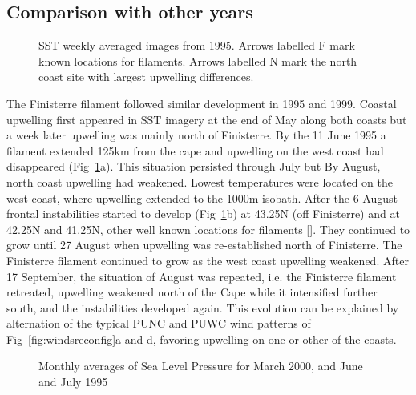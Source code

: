 \subsection{Comparison with other years}
\subcapnoonelinetrue \subfiguretopcapfalse
\begin{figure}[t]
\centering \subfigure[June 18-24]
{\texttt{[image: ga950618]}}\quad \subfigure[August
06-12] {\texttt{[image: ga950806]}}\quad \caption{SST
weekly averaged images from 1995. Arrows labelled F mark known
locations for filaments. Arrows labelled N mark the north coast
site with largest upwelling differences.}\label{fig:windssst95}
\end{figure}

The Finisterre filament followed similar development in 1995 and
1999. Coastal upwelling first appeared in SST imagery at the end
of May along both coasts but a week later upwelling was mainly
north of Finisterre. By the 11 June 1995 a filament extended 125km
from the cape and upwelling on the west coast had disappeared
({Fig~\ref{fig:windssst95}}a). This situation persisted through
July but By August, north coast upwelling had weakened. Lowest
temperatures were located on the west coast, where upwelling
extended to the 1000m isobath. After the 6 August frontal
instabilities started to develop ({Fig~\ref{fig:windssst95}}b) at
43.25\deg N (off Finisterre) and at 42.25\deg N and 41.25\deg N,
other well known locations for filaments
\nocite{Haynes93}[]. They
continued to grow until 27 August when upwelling was
re-established north of Finisterre. The Finisterre filament
continued to grow as the west coast upwelling weakened. After 17
September, the situation of August was repeated, i.e. the
Finisterre filament retreated, upwelling weakened north of the
Cape  while it intensified further south, and the instabilities
developed again.  This evolution can be explained by alternation
of the typical PUNC and PUWC wind patterns of
Fig~\ref{fig:windsreconfig}a and d, favoring upwelling on one or
other of the coasts.

\noindent \subfiguretopcaptrue
\begin{figure}[t]
\centering {}\quad
{}\quad
{}
\caption{Monthly averages of Sea Level Pressure for March 2000,
and June and July 1995}\label{fig:windsslp}
\end{figure}

